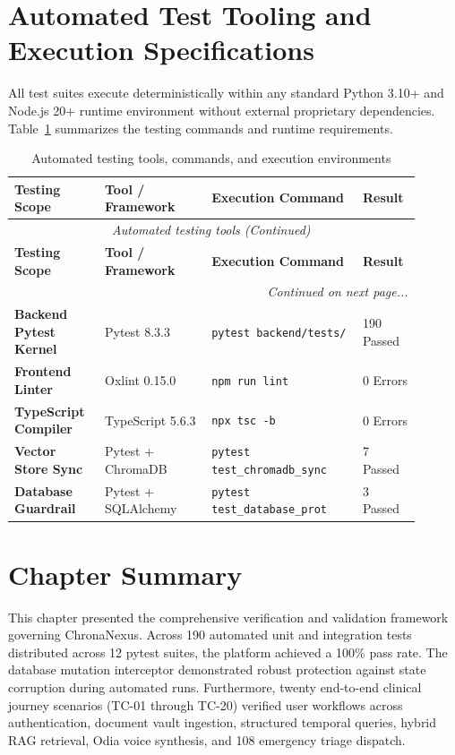 \section{Automated Test Tooling and Execution Specifications}
\label{sec:execution_specifications}

All test suites execute deterministically within any standard Python 3.10+ and Node.js 20+ runtime environment without external proprietary dependencies. Table~\ref{tab:7_4_tooling} summarizes the testing commands and runtime requirements.

\small
\begin{longtable}{@{}p{0.20\linewidth} p{0.24\linewidth} p{0.34\linewidth} p{0.12\linewidth}@{}}
\caption{Automated testing tools, commands, and execution environments}\label{tab:7_4_tooling} \\
\toprule
\textbf{Testing Scope} & \textbf{Tool / Framework} & \textbf{Execution Command} & \textbf{Result} \\
\midrule
\endfirsthead
\toprule
\multicolumn{4}{c}{\small\textit{Automated testing tools (Continued)}} \\[4pt]
\midrule
\textbf{Testing Scope} & \textbf{Tool / Framework} & \textbf{Execution Command} & \textbf{Result} \\
\midrule
\endhead
\midrule
\multicolumn{4}{r}{\footnotesize\textit{Continued on next page...}} \\
\bottomrule
\endfoot
\bottomrule
\endlastfoot
\textbf{Backend Pytest Kernel} & Pytest 8.3.3 & \texttt{pytest backend/tests/} & 190 Passed \\
\textbf{Frontend Linter} & Oxlint 0.15.0 & \texttt{npm run lint} & 0 Errors \\
\textbf{TypeScript Compiler} & TypeScript 5.6.3 & \texttt{npx tsc -b} & 0 Errors \\
\textbf{Vector Store Sync} & Pytest + ChromaDB & \texttt{pytest test\_chromadb\_sync} & 7 Passed \\
\textbf{Database Guardrail} & Pytest + SQLAlchemy & \texttt{pytest test\_database\_prot} & 3 Passed \\
\bottomrule
\end{longtable}
\normalsize

\section{Chapter Summary}

This chapter presented the comprehensive verification and validation framework governing ChronaNexus. Across 190 automated unit and integration tests distributed across 12 pytest suites, the platform achieved a 100\% pass rate. The database mutation interceptor demonstrated robust protection against state corruption during automated runs. Furthermore, twenty end-to-end clinical journey scenarios (TC-01 through TC-20) verified user workflows across authentication, document vault ingestion, structured temporal queries, hybrid RAG retrieval, Odia voice synthesis, and 108 emergency triage dispatch.
